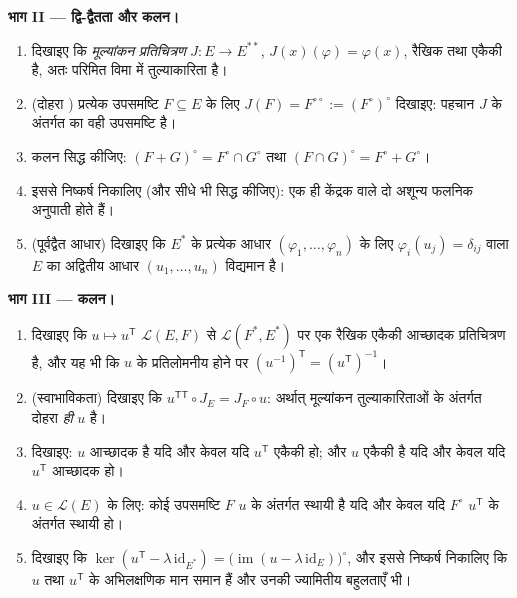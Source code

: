 \begin{problem}[{सप्ताहांत समस्या --- परिमित विमा में द्वैतता
और फ्रेडहोम विकल्प}]
\medskip
\noindent\textbf{भाग II --- द्वि-द्वैतता और  कलन।}
\begin{enumerate}[resume]
  \item दिखाइए कि \emph{मूल्यांकन प्रतिचित्रण} $J \colon E \to
        E^{**}$, $J(x)(\varphi) = \varphi(x)$, रैखिक तथा
        एकैकी है, अतः परिमित विमा में तुल्याकारिता है।
  \item (दोहरा ) प्रत्येक उपसमष्टि $F \subseteq E$ के लिए $J(F) = F^{\circ\circ} :=
        (F^\circ)^\circ$ दिखाइए:
        पहचान $J$ के अंतर्गत  का  वही उपसमष्टि है।
  \item {} कलन सिद्ध कीजिए: $(F + G)^\circ = F^\circ
        \cap G^\circ$ तथा $(F \cap G)^\circ = F^\circ + G^\circ$।
  \item इससे निष्कर्ष निकालिए (और सीधे भी सिद्ध कीजिए): एक ही केंद्रक
        वाले दो अशून्य फलनिक अनुपाती होते हैं।
  \item (पूर्वद्वैत आधार) दिखाइए कि $E^*$ के प्रत्येक आधार $(\varphi_1,
        \dots, \varphi_n)$ के लिए
        $\varphi_i(u_j) =
        \delta_{ij}$ वाला $E$ का अद्वितीय आधार $(u_1, \dots, u_n)$ विद्यमान है।
\end{enumerate}

\medskip
\noindent\textbf{भाग III ---  कलन।}
\begin{enumerate}[resume]
  \item दिखाइए कि $u \mapsto u^{\mathsf T}$ $\mathcal{L}(E, F)$ से $\mathcal{L}(F^*, E^*)$ पर एक रैखिक एकैकी आच्छादक
        प्रतिचित्रण है, और यह भी कि $u$ के प्रतिलोमनीय होने पर $(u^{-1})^{\mathsf T} = (u^{\mathsf T})^{-1}$।
  \item (स्वाभाविकता) दिखाइए कि $u^{\mathsf T\mathsf T} \circ J_E
        = J_F \circ u$: अर्थात् मूल्यांकन तुल्याकारिताओं
        के अंतर्गत दोहरा  \emph{ही} $u$ है।
  \item दिखाइए: $u$ आच्छादक है यदि और केवल यदि $u^{\mathsf T}$ एकैकी हो; और $u$
        एकैकी है यदि और केवल यदि $u^{\mathsf T}$ आच्छादक हो।
  \item $u \in \mathcal{L}(E)$ के लिए: कोई उपसमष्टि $F$ $u$ के अंतर्गत स्थायी है यदि
        और केवल यदि $F^\circ$ $u^{\mathsf T}$ के अंतर्गत स्थायी हो।
  \item दिखाइए कि $\ker(u^{\mathsf T} - \lambda\,
        \mathrm{id}_{E^*}) = \bigl(\operatorname{im}(u - \lambda\,
        \mathrm{id}_E)\bigr)^\circ$, और इससे निष्कर्ष निकालिए कि $u$ तथा $u^{\mathsf T}$ के
        अभिलक्षणिक मान समान हैं और उनकी ज्यामितीय बहुलताएँ भी।
\end{enumerate}


\end{problem}
